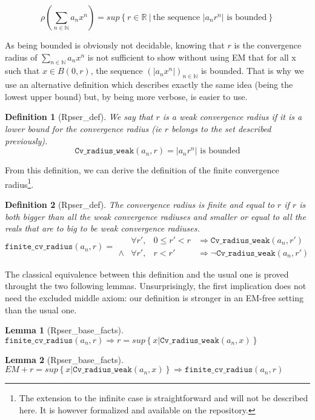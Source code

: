 \documentclass[submission,copyright]{eptcs}
\newcommand{\N}{\mathbb{N}}
\newcommand{\R}{\mathbb{R}}
\newcommand{\cvrw}{\texttt{Cv\_radius\_weak}}
\newcommand{\fcvr}{\texttt{finite\_cv\_radius}}
\newtheorem{definition}{Definition}
\newtheorem{lemma}{Lemma}
\begin{document}
 $$\rho(\sum_{n \in \N} a_n x^n) = sup \left\lbrace r \in \R ~|~
   \text{the sequence } \left|a_n r^n\right| \text{ is bounded}
   \right\rbrace$$

As being bounded is obviously not decidable, knowing that $r$ is the
convergence radius of $\sum_{n \in \N} a_n x^n$ is not sufficient to
show without using EM that for all x such that $x \in B(0,r)$, the
sequence $(\left| a_n x^n \right|)_{n \in \N}$ is bounded. That is why
we use an alternative definition which describes exactly the same
idea (being the lowest upper bound) but, by being more verbose, is
easier to use.

\begin{definition}[Rpser\_def] We say that $r$ is a weak convergence
radius if it is a lower bound for the convergence radius (ie $r$ belongs
to the set described previously).
$$\cvrw{}(a_n,r) = \left| a_n r^n \right| \text{ is bounded}$$
\end{definition}

From this definition, we can derive the definition of the finite
convergence radius\footnote{The extension to the infinite case is
straightforward and will not be described here. It is however formalized
and available on the repository.}.

\begin{definition}[Rpser\_def] The convergence radius is finite and
equal to $r$ if $r$ is both bigger than all the weak convergence radiuses 
and smaller or equal to all the reals that are to big to be weak
convergence radiuses.
$$\fcvr{}(a_n,r) =
\begin{array}{clcl}
        & \forall r', & 0 \le r' < r & \Rightarrow \cvrw{}(a_n,r') \\
 \wedge & \forall r', & r < r' & \Rightarrow \neg \cvrw{}(a_n,r')
\end{array}$$
\end{definition}

The classical equivalence between this definition and the usual one is proved
throught the two following lemmas. Unsurprisingly, the first implication does
not need the excluded middle axiom: our definition is stronger in an EM-free
setting than the usual one.

\begin{lemma}[Rpser\_base\_facts] $\fcvr{}(a_n,r) \Rightarrow r = sup \left\lbrace x |
\cvrw{}(a_n, x) \right\rbrace$ \end{lemma}

\begin{lemma}[Rpser\_base\_facts] $EM + r = sup \left\lbrace x |
\cvrw{}(a_n, x) \right\rbrace \Rightarrow \fcvr{}(a_n,r)$ \end{lemma}
\end{document}
